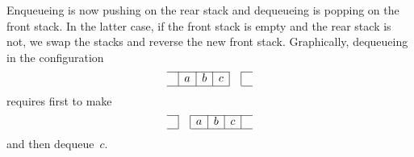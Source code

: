 Enqueueing is now pushing on the rear stack and dequeueing is popping
on the front stack. In the latter case, if the front stack is empty
and the rear stack is not, we swap the stacks and reverse the new
front stack. Graphically, dequeueing in the configuration
\begin{equation*}
\begin{array}{c|c|c|c|c|c} \cline{1-4}\cline{6-6} & a & b & c &
&\\ \cline{1-4}\cline{6-6}
\end{array}
\end{equation*}
requires first to make
\begin{equation*}
\begin{array}{c|c|c|c|c|c}
  \cline{1-1}\cline{3-6}
  & & a & b & c &\\
  \cline{1-1}\cline{3-6}
\end{array}
\end{equation*}
and then dequeue~\(c\).

